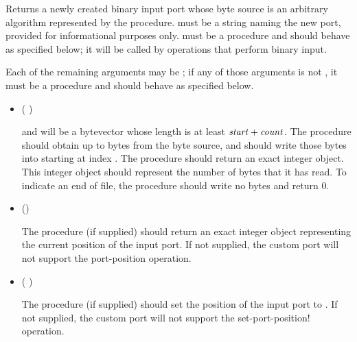 \begin{entry}{%
}

Returns a newly created binary input port whose byte source is
an arbitrary algorithm represented by the  procedure.
 must be a string naming the new port,
provided for informational purposes only.
 must be a procedure and should behave as specified
below; it will be called by operations that perform binary input.

Each of the remaining arguments may be \schfalse{}; if any of
those arguments is not \schfalse{}, it must be a procedure and
should behave as specified below.
   
\begin{itemize}
\item {\cf (   )}
       
  and  will be a bytevector whose length is at least
  $\textnormal{\textit{start}} + \textnormal{\textit{count}}$.
  The  procedure should obtain up to  bytes
  from the byte source, and should write those bytes
  into  starting at index .
  The  procedure should return an exact integer object.  This
  integer object should represent the number of bytes that it has read.
  To indicate an end of file, the 
  procedure should write no bytes and return 0.

\item {\cf ()}
       
  The  procedure (if supplied) should return an exact
  integer object representing the current position of
  the input port.  If not supplied, the custom port will not support
  the {\cf port-position} operation.
  
\item {\cf ( )}
       
  The  procedure (if supplied) should set the
  position of the input port to .  If not supplied, the custom
  port will not support the {\cf set-port-position!} operation.
       

\end{itemize}
\end{entry}
